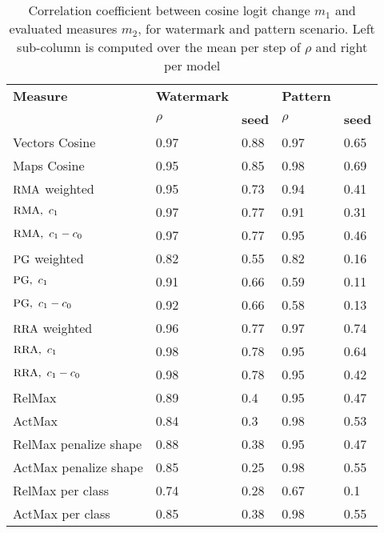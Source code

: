 \begin{table}[!ht]
    \centering
    \begin{tabular}{|l|ll|ll|}
    \hline
        \textbf{Measure}& \textbf{Watermark} &  & \textbf{Pattern} &  \\ 
        & $\rho$ & \textbf{seed} & $\rho$  & \textbf{seed} \\ \hline
        Vectors Cosine & 0.97 & 0.88 & 0.97 & 0.65 \\
        Maps Cosine & 0.95 & 0.85 & 0.98 & 0.69 \\ \hline
        $\operatorname*{RMA}$ weighted & 0.95 & 0.73 & 0.94 & 0.41 \\ 
        $\RMA, \ c_1$ & 0.97 & 0.77 & 0.91 & 0.31 \\
        $\operatorname*{RMA}, \ c_1 - c_0$ & 0.97 & 0.77 & 0.95 & 0.46 \\ \hline
        $\operatorname*{PG}$ weighted & 0.82 & 0.55 & 0.82 & 0.16 \\ 
        $\PG, \ c_1$ & 0.91 & 0.66 & 0.59 & 0.11 \\
        $\operatorname*{PG}, \ c_1 - c_0$ & 0.92 & 0.66 & 0.58 & 0.13 \\\hline
        $\operatorname*{RRA}$ weighted & 0.96 & 0.77 & 0.97 & 0.74 \\ 
        $\operatorname*{RRA},\  c_1$ & 0.98 & 0.78 & 0.95 & 0.64 \\
        $\operatorname*{RRA},\  c_1 - c_0$ & 0.98 & 0.78 & 0.95 & 0.42 \\ \hline
        RelMax& 0.89 & 0.4 & 0.95 & 0.47 \\ 
        ActMax& 0.84 & 0.3 & 0.98 & 0.53 \\ \hline
        RelMax penalize shape& 0.88 & 0.38 & 0.95 & 0.47 \\ 
        ActMax penalize shape& 0.85 & 0.25 & 0.98 & 0.55 \\\hline 
        RelMax per class & 0.74 & 0.28 & 0.67 & 0.1 \\ 
        ActMax per class & 0.85 & 0.38 & 0.98 & 0.55 \\ \hline
    \end{tabular}
    \caption{Correlation coefficient between cosine logit change $m_1$ and evaluated measures $m_2$, for watermark and pattern scenario. Left sub-column is computed over the mean per step of $\rho$ and right per model}
\end{table}
